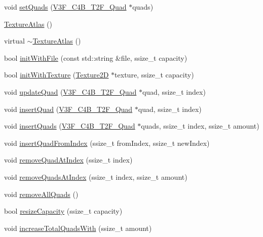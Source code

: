 \begin{DoxyCompactItemize}
\item 
void \hyperlink{classTextureAtlas_a59e3e4fea0e05019cfc94bea32122467}{set\+Quads} (\hyperlink{structV3F__C4B__T2F__Quad}{V3\+F\+\_\+\+C4\+B\+\_\+\+T2\+F\+\_\+\+Quad} $\ast$quads)
\item 
\hyperlink{classTextureAtlas_ad38d24295c6a728256392a9f2bcdf8e7}{Texture\+Atlas} ()
\item 
virtual \hyperlink{classTextureAtlas_a9d0defc60f5625e783f8725d6d75bbb7}{$\sim$\+Texture\+Atlas} ()
\item 
bool \hyperlink{classTextureAtlas_a325b82009a3ae2ec31ac42374eed1ab6}{init\+With\+File} (const std\+::string \&file, ssize\+\_\+t capacity)
\item 
bool \hyperlink{classTextureAtlas_a44ea8a3d38f0e758e33c6b10c725b44b}{init\+With\+Texture} (\hyperlink{classTexture2D}{Texture2D} $\ast$texture, ssize\+\_\+t capacity)
\item 
void \hyperlink{classTextureAtlas_a3811e75915851fc5035804f3ecc5423e}{update\+Quad} (\hyperlink{structV3F__C4B__T2F__Quad}{V3\+F\+\_\+\+C4\+B\+\_\+\+T2\+F\+\_\+\+Quad} $\ast$quad, ssize\+\_\+t index)
\item 
void \hyperlink{classTextureAtlas_a7dc5079e603e3b7e78e73a1094d1560b}{insert\+Quad} (\hyperlink{structV3F__C4B__T2F__Quad}{V3\+F\+\_\+\+C4\+B\+\_\+\+T2\+F\+\_\+\+Quad} $\ast$quad, ssize\+\_\+t index)
\item 
void \hyperlink{classTextureAtlas_ab80aca4252af179afcbc6e23208407f5}{insert\+Quads} (\hyperlink{structV3F__C4B__T2F__Quad}{V3\+F\+\_\+\+C4\+B\+\_\+\+T2\+F\+\_\+\+Quad} $\ast$quads, ssize\+\_\+t index, ssize\+\_\+t amount)
\item 
void \hyperlink{classTextureAtlas_a5808a77487d3f789156a93ceb18df85b}{insert\+Quad\+From\+Index} (ssize\+\_\+t from\+Index, ssize\+\_\+t new\+Index)
\item 
void \hyperlink{classTextureAtlas_a67ab93a008f52e7d204ae8a402f71a9b}{remove\+Quad\+At\+Index} (ssize\+\_\+t index)
\item 
void \hyperlink{classTextureAtlas_ab1c31f38025e77b95050fd798bd76919}{remove\+Quads\+At\+Index} (ssize\+\_\+t index, ssize\+\_\+t amount)
\item 
void \hyperlink{classTextureAtlas_aff17a9d95e8b279381d4b4820d0893f4}{remove\+All\+Quads} ()
\item 
bool \hyperlink{classTextureAtlas_a2df218231fad90b00cbf5f7b8de2ecdf}{resize\+Capacity} (ssize\+\_\+t capacity)
\item 
void \hyperlink{classTextureAtlas_a69818ba2fc5488effec077ff3a3a506c}{increase\+Total\+Quads\+With} (ssize\+\_\+t amount)

\end{DoxyCompactItemize}
